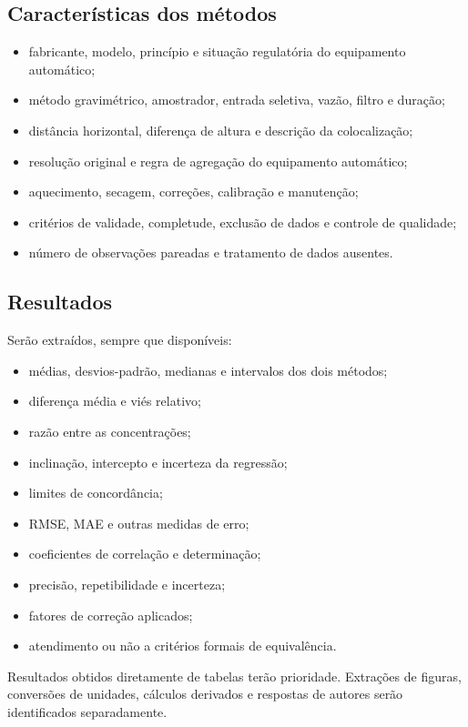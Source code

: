 \documentclass[11pt,a4paper]{article}
\begin{document}
\subsection{Características dos métodos}

\begin{itemize}
  \item fabricante, modelo, princípio e situação regulatória do equipamento automático;
  \item método gravimétrico, amostrador, entrada seletiva, vazão, filtro e duração;
  \item distância horizontal, diferença de altura e descrição da colocalização;
  \item resolução original e regra de agregação do equipamento automático;
  \item aquecimento, secagem, correções, calibração e manutenção;
  \item critérios de validade, completude, exclusão de dados e controle de qualidade;
  \item número de observações pareadas e tratamento de dados ausentes.
\end{itemize}

\subsection{Resultados}

Serão extraídos, sempre que disponíveis:

\begin{itemize}
  \item médias, desvios-padrão, medianas e intervalos dos dois métodos;
  \item diferença média e viés relativo;
  \item razão entre as concentrações;
  \item inclinação, intercepto e incerteza da regressão;
  \item limites de concordância;
  \item RMSE, MAE e outras medidas de erro;
  \item coeficientes de correlação e determinação;
  \item precisão, repetibilidade e incerteza;
  \item fatores de correção aplicados;
  \item atendimento ou não a critérios formais de equivalência.
\end{itemize}

Resultados obtidos diretamente de tabelas terão prioridade. Extrações de figuras,
conversões de unidades, cálculos derivados e respostas de autores serão identificados
separadamente.
\end{document}
